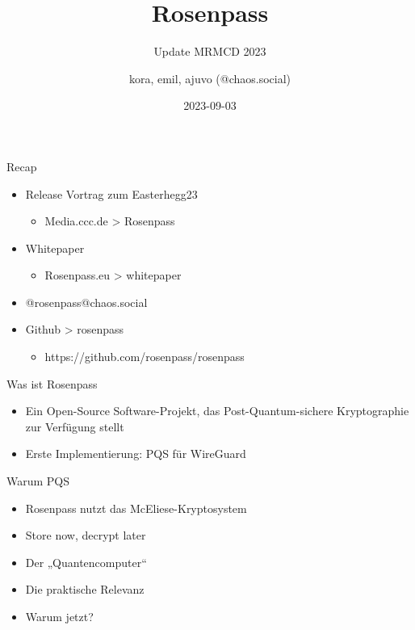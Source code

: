 \documentclass{rosenpass-beamer}
\title{Rosenpass}
\subtitle{Update MRMCD 2023}
\author{kora, emil, ajuvo (@chaos.social)}
\institute{\url{https://rosenpass.eu}}
\date{2023-09-03}
\begin{document}
\maketitle


	\begin{frame}{Recap}
		\begin{itemize}
			\item Release Vortrag zum Easterhegg23
				\begin{itemize}
					\item Media.ccc.de > Rosenpass
				\end{itemize}
			
			\item Whitepaper
				\begin{itemize}
					\item Rosenpass.eu > whitepaper
				\end{itemize}
			
			\item @rosenpass@chaos.social
	
			\item Github > rosenpass
				\begin{itemize}
					\item https://github.com/rosenpass/rosenpass
				\end{itemize}
		\end{itemize}
	\end{frame}
		
		
	\begin{frame}{Was ist Rosenpass}
		\begin{itemize}
			\item Ein Open-Source Software-Projekt, das Post-Quantum-sichere Kryptographie zur Verfügung stellt
			\item Erste Implementierung: PQS für WireGuard
		\end{itemize}
	\end{frame}		


	\begin{frame}{Warum PQS}
		\begin{itemize}
			\item Rosenpass nutzt das McEliese-Kryptosystem
			\item Store now, decrypt later
			\item Der „Quantencomputer“
			\item Die praktische Relevanz
			\item Warum jetzt?
		\end{itemize}
	\end{frame}
\end{document}
